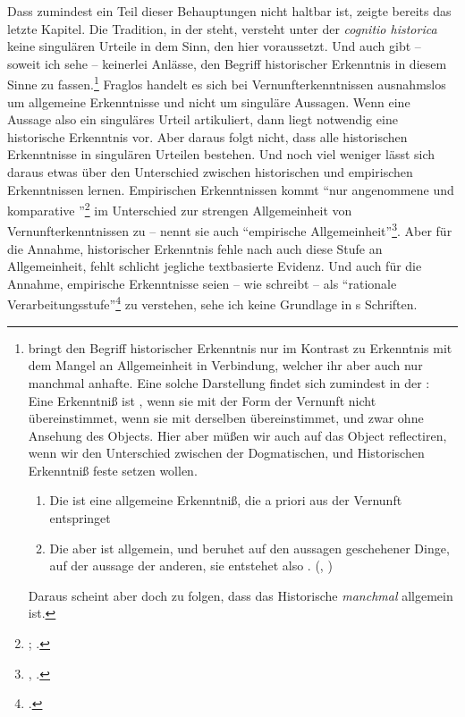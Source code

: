 Dass zumindest ein Teil dieser Behauptungen nicht haltbar ist, zeigte bereits
das letzte Kapitel. Die Tradition, in der  steht, versteht
unter der \emph{cognitio historica} keine singulären Urteile in dem Sinn, den
 hier voraussetzt. Und auch
 gibt -- soweit ich sehe -- keinerlei Anlässe, den Begriff
historischer Erkenntnis in diesem Sinne zu
fassen.\footnote{ bringt den Begriff historischer
Erkenntnis nur im Kontrast zu  Erkenntnis mit dem
Mangel an Allgemeinheit in Verbindung, welcher ihr aber auch nur manchmal
anhafte. Eine solche Darstellung findet sich zumindest in der :
\leftquote Eine Erkenntniß ist , wenn sie mit der Form der
Vernunft nicht übereinstimmet,  wenn sie mit derselben
übereinstimmet, und zwar ohne Ansehung des Objects. Hier aber müßen wir auch
auf das Object reflectiren, wenn wir den Unterschied zwischen der
Dogmatischen, und Historischen Erkenntniß feste setzen wollen.
\begin{enumerate}
  \item[1.\textsuperscript{mo}] Die  ist eine allgemeine
  Erkenntniß, die a priori aus der Vernunft entspringet
  \item[2.\textsuperscript{do}] Die  aber ist  allgemein, und beruhet auf den aussagen geschehener Dinge, auf der
  aussage der anderen, sie entstehet also .\rightquote{}
  \mkbibparens{\cite{Kant:LogikBlomberg1966}, \cite[][XXIV:
99.14--24]{Kant:GesammelteWerke1900ff.}}\end{enumerate} Daraus scheint
  aber doch zu folgen, dass das Historische
  \emph{manchmal} allgemein ist.}
Fraglos handelt es sich bei Vernunfterkenntnissen ausnahmslos
um allgemeine Erkenntnisse und nicht um singuläre Aussagen. Wenn eine Aussage also ein
singuläres Urteil artikuliert, dann liegt notwendig eine historische Erkenntnis
vor. Aber daraus folgt nicht, dass alle historischen Erkenntnisse in singulären
Urteilen bestehen. Und noch viel weniger lässt sich daraus etwas über den
Unterschied zwischen historischen und empirischen Erkenntnissen lernen.
Empirischen Erkenntnissen kommt \enquote{nur angenommene und komparative
}\footnote{\cite[][B 3]{Kant:KritikderreinenVernunft2003};
\cite[][III: 29.3--4]{Kant:GesammelteWerke1900ff.}.} im Unterschied zur strengen Allgemeinheit von
Vernunfterkenntnissen zu --  nennt sie auch
\enquote{empirische Allgemeinheit}\footnote{\cite[][B
4]{Kant:KritikderreinenVernunft2003}, \cite[][III:
29.9]{Kant:GesammelteWerke1900ff.}.}. Aber für die Annahme, historischer
Erkenntnis fehle nach  auch diese Stufe an Allgemeinheit,
fehlt schlicht jegliche textbasierte Evidenz. Und auch für die Annahme,
empirische Erkenntnisse seien -- wie
 schreibt -- als
\enquote{rationale
Verarbeitungsstufe}\footcite[][99]{Kambartel:ErfahrungundStruktur1968} zu
verstehen, sehe ich keine Grundlage in s Schriften.


